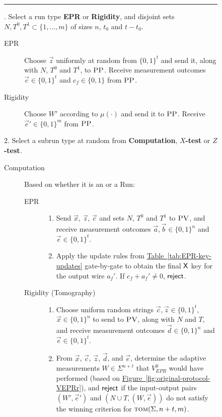 \documentclass[11pt]{article}
\numberwithin{equation}{section}
\theoremstyle{definition}
\theoremstyle{plain}
\newcommand{\expref}[2]{\hyperref[#2]{#1~\ref{#2}}}
\newcommand{\tom}{\textsc{tom}}
\newcommand{\pv}{\textsc{PV}}
\newcommand{\pp}{\textsc{PP}}
\begin{document}
\begin{figure}[H]
\rule[1ex]{\textwidth}{0.5pt}
\vspace{-20pt}
. Select a run type \textbf{EPR} or \textbf{Rigidity}, and disjoint sets $N,T^0,T^1\subset \{1,\ldots,m\}$ of sizes $n$, $t_0$ and $t-t_0$.  
\begin{description}
\item[EPR] Choose $\vec{z}$ uniformly at random from $\{0,1\}^t$ and send it, along with $N$, $T^0$ and $T^1$, to $\pp$. Receive measurement outcomes $\vec{c}\in\{0,1\}^t$ and $c_f\in\{0,1\}$ from $\pp$.
\vspace{-0.15cm}  %
\item[Rigidity] Choose $W'$ according to $\mu(\cdot)$ and send it to $\pp$. Receive $\vec{e}'\in \{0,1\}^m$ from $\pp$. 
\end{description}
2. Select a subrun type at random from \textbf{Computation}, \textbf{$X$-test} or \textbf{$Z$-test}. 
\begin{description}
\item[Computation] Based on whether it is
an  or a  Run:
\vspace{-0.07cm}   %
	\begin{description}
	\item[EPR]
		\begin{enumerate}
		\item[(i)] Send $\vec{x}$, $\vec{z}$, $\vec{c}$ and sets $N$, $T^0$ and $T^1$ to $\pv$, and receive measurement outcomes $\vec{a},\vec{b}\in \{0,1\}^n$ and $\vec{e}\in\{0,1\}^t$.
		\item[(ii)] Apply the update rules from \expref{Table}{tab:EPR-key-updates} gate-by-gate to obtain the final $\sf X$ key for the output wire $a_f'$. If $c_f+a_f'\neq 0$, $\sf reject$. 
		\end{enumerate}
\vspace{-0.15cm}  %
	\item[Rigidity (Tomography)]
		\begin{enumerate}
		\item[(i)] Choose uniform random strings $\vec{c},\vec{z}\in\{0,1\}^t$, $\vec{x} \in \{0,1\}^n$ 
		to send to $\pv$, along with $N$ and $T$, and receive measurement outcomes $\vec{d}\in \{0,1\}^n$ and $\vec{e}\in\{0,1\}^t$. 
		\item[(ii)]
		From $\vec{x}$, $\vec{c}$, $\vec{z}$, $\vec{d}$, and $\vec{e}$, determine the adaptive measurements $W\in\Sigma^{n+t}$ that $V_{EPR}^0$ would have performed (based on \expref{Figure}{fig:original-protocol-VEPRr}), and $\sf reject$ if the input-output pairs $(W',\vec{e}')$ and $(N\cup T,(W,\vec{e}))$ do not satisfy the winning criterion for $\tom(\Sigma,n+t,m)$.

\end{enumerate}
\end{description}
\end{description}
\end{figure}
\end{document}
